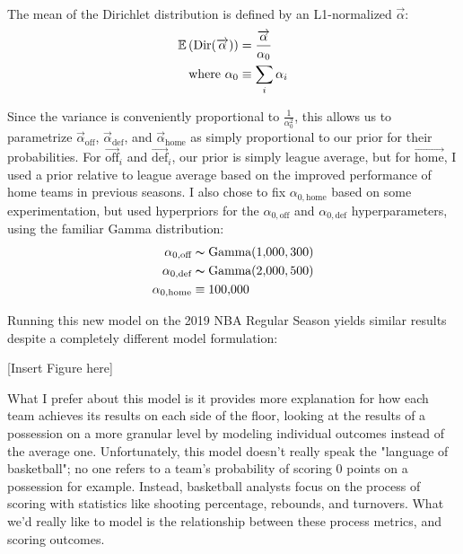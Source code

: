 \documentclass[12 pt]{article}
\begin{document}
\begin{flushleft}
The mean of the Dirichlet distribution is defined by an L1-normalized $ \overrightarrow{\alpha} $:
\begin{align}
\operatorname{\mathbb{E}} \left(\text{Dir}(\overrightarrow{\alpha})\right) &= \frac{\overrightarrow{\alpha}}{\alpha_0} \notag \\
\text{where } \alpha_0 &\equiv \sum_i{\alpha_i} \notag
\end{align}

Since the variance is conveniently proportional to $ \frac{1}{\alpha_0^2} $, this allows us to parametrize $ \overrightarrow{\alpha}_{\text{off}} $, $ \overrightarrow{\alpha}_{\text{def}} $, and $ \overrightarrow{\alpha}_{\text{home}} $ as simply proportional to our prior for their probabilities.
For $ \overrightarrow{\text{off}}_i $ and $ \overrightarrow{\text{def}}_i $, our prior is simply league average, but for $ \overrightarrow{\text{home}} $, I used a prior relative to league average based on the improved performance of home teams in previous seasons.
I also chose to fix $ \alpha_{0,\text{home}} $ based on some experimentation, but used hyperpriors for the $ \alpha_{0,\text{off}}$ and $\alpha_{0,\text{def}}$ hyperparameters, using the familiar Gamma distribution:
\begin{align}
\alpha_{0,\text{off}} &\thicksim \text{Gamma}(1{,}000, 300) \notag \\
\alpha_{0,\text{def}} &\thicksim \text{Gamma}(2{,}000, 500) \notag \\
\alpha_{0,\text{home}} &\equiv 100{,}000 \notag
\end{align}

Running this new model on the 2019 NBA Regular Season yields similar results despite a completely different model formulation:

[Insert Figure here]

What I prefer about this model is it provides more explanation for how each team achieves its results on each side of the floor, looking at the results of a possession on a more granular level by modeling individual outcomes instead of the average one.
Unfortunately, this model doesn't really speak the "language of basketball"; no one refers to a team's probability of scoring 0 points on a possession for example.
Instead, basketball analysts focus on the process of scoring with statistics like shooting percentage, rebounds, and turnovers.
What we'd really like to model is the relationship between these process metrics, and scoring outcomes.

\vspace{5mm}


\end{flushleft}
\end{document}
